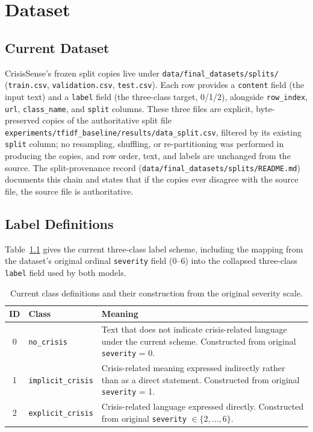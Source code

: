 \chapter{Dataset}
\label{ch:dataset}

\section{Current Dataset}

CrisisSense's frozen split copies live under \texttt{data/\pbrk final\_\pbrk datasets/\pbrk splits/\pbrk } (\texttt{train.csv}, \texttt{validation.csv}, \texttt{test.csv}). Each row provides a \texttt{content} field (the input text) and a \texttt{label} field (the three-class target, 0/1/2), alongside \texttt{row\_index}, \texttt{url}, \texttt{class\_name}, and \texttt{split} columns. These three files are explicit, byte-preserved copies of the authoritative split file \texttt{experiments/\pbrk tfidf\_\pbrk baseline/\pbrk results/\pbrk data\_\pbrk split.csv}, filtered by its existing \texttt{split} column; no resampling, shuffling, or re-partitioning was performed in producing the copies, and row order, text, and labels are unchanged from the source. The split-provenance record (\texttt{data/\pbrk final\_\pbrk datasets/\pbrk splits/\pbrk README.md}) documents this chain and states that if the copies ever disagree with the source file, the source file is authoritative.

\section{Label Definitions}

Table~\ref{tab:class-defs} gives the current three-class label scheme, including the mapping from the dataset's original ordinal \texttt{severity} field (0--6) into the collapsed three-class \texttt{label} field used by both models.

\begin{table}[H]
\centering
\caption{Current class definitions and their construction from the original severity scale.}
\label{tab:class-defs}
\begin{tabular}{clp{7.2cm}}
\toprule
\textbf{ID} & \textbf{Class} & \textbf{Meaning} \\
\midrule
0 & \texttt{no\_crisis} & Text that does not indicate crisis-related language under the current scheme. Constructed from original \texttt{severity} = 0. \\
1 & \texttt{implicit\_crisis} & Crisis-related meaning expressed indirectly rather than as a direct statement. Constructed from original \texttt{severity} = 1. \\
2 & \texttt{explicit\_crisis} & Crisis-related language expressed directly. Constructed from original \texttt{severity} $\in \{2,\dots,6\}$. \\
\bottomrule
\end{tabular}
\end{table}

